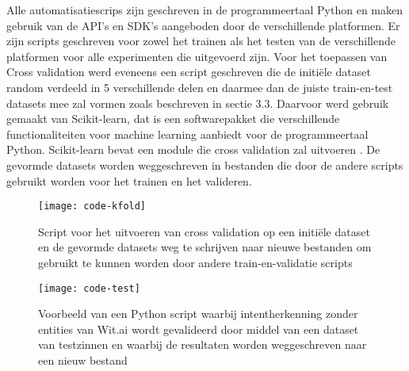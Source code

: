 Alle automatisatiescrips zijn geschreven in de programmeertaal Python en maken gebruik van de API’s en SDK's aangeboden door de verschillende platformen. Er zijn scripts geschreven voor zowel het trainen als het testen van de verschillende platformen voor alle experimenten die uitgevoerd zijn. Voor het toepassen van Cross validation werd eveneens een script geschreven die de initiële dataset random verdeeld in 5 verschillende delen en daarmee dan de juiste train-en-test datasets mee zal vormen zoals beschreven in sectie 3.3. Daarvoor werd gebruik gemaakt van Scikit-learn, dat is een softwarepakket die verschillende functionaliteiten voor machine learning aanbiedt voor de programmeertaal Python. Scikit-learn bevat een module die cross validation zal uitvoeren \autocite{sklearn2020}. De gevormde datasets worden weggeschreven in bestanden die door de andere scripts gebruikt worden voor het trainen en het valideren.

\begin{figure}[H]
    \label{fig:code-kfold}
    \centering
    \texttt{[image: code-kfold]}
    \caption{Script voor het uitvoeren van cross validation op een initiële dataset en de gevormde datasets weg te schrijven naar nieuwe bestanden om gebruikt te kunnen worden door andere train-en-validatie scripts}
\end{figure}

\begin{figure}[H]
    \label{fig:code-validatie}
    \centering
    \texttt{[image: code-test]}
    \caption{Voorbeeld van een Python script waarbij intentherkenning zonder entities van Wit.ai wordt gevalideerd door middel van een dataset van testzinnen en waarbij de resultaten worden weggeschreven naar een nieuw bestand}
\end{figure}

























